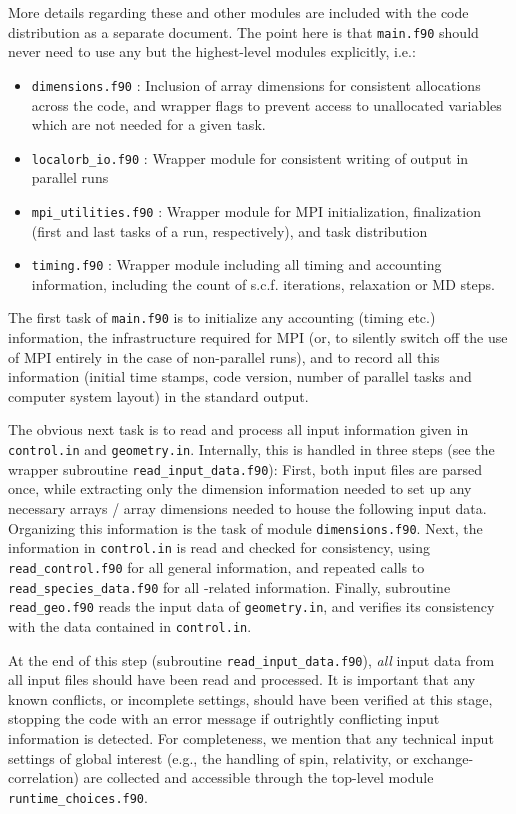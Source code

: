 More details regarding these and other
modules are included with the code distribution as a separate
document. The point here is that \texttt{main.f90} should never need
to use any but the highest-level modules explicitly, i.e.:
\begin{itemize}
  \item \texttt{dimensions.f90} : Inclusion of array dimensions
    for consistent allocations across the code, and wrapper flags to
    prevent access to unallocated variables which are not needed for a
    given task.
  \item \texttt{localorb\_io.f90} : Wrapper module for consistent
    writing of output in parallel runs
  \item \texttt{mpi\_utilities.f90} : Wrapper module for MPI
    initialization, finalization (first and last tasks of a run,
    respectively), and task distribution
  \item \texttt{timing.f90} : Wrapper module including all timing and
    accounting information, including the count of s.c.f. iterations,
    relaxation or MD steps.
\end{itemize}

The first task of \texttt{main.f90} is to initialize any accounting
(timing etc.) information, the infrastructure required for MPI (or, to
silently switch off the use of MPI entirely in the case of
non-parallel runs), and to record all this information (initial time
stamps, code version, number of parallel tasks and computer system
layout) in the standard output.

The obvious next task is to read and process all input information
given in \texttt{control.in} and \texttt{geometry.in}. Internally,
this is handled in three steps (see the wrapper subroutine
\texttt{read\_input\_data.f90}): First, both input files are parsed once,
while extracting only the dimension information needed to set up any
necessary arrays / array dimensions needed to house the following
input data. Organizing this information is the task of module
\texttt{dimensions.f90}. Next, the information in \texttt{control.in}
is read and checked for consistency, using \texttt{read\_control.f90}
for all general information, and repeated calls to
\texttt{read\_species\_data.f90} for all -related
information. Finally, subroutine \texttt{read\_geo.f90} reads the
input data of \texttt{geometry.in}, and verifies its consistency with
the data contained in \texttt{control.in}.

At the end of this step (subroutine \texttt{read\_input\_data.f90}),
\emph{all} input data from all input files should have been read and
processed. It is important that any known conflicts, or incomplete
settings, should have been verified at this stage, stopping the code
with an error message if outrightly conflicting input information is
detected. For completeness, we mention that any technical input
settings of global interest (e.g., the handling of spin, relativity,
or exchange-correlation) are collected and accessible through the
top-level module \texttt{runtime\_choices.f90}. 

